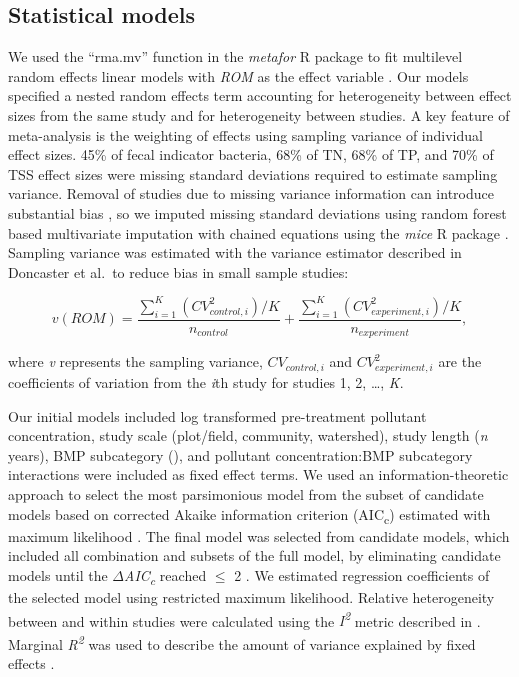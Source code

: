 \documentclass[utf8]{FrontiersinHarvard}
\begin{document}
\hypertarget{statistical-models}{%
\subsection{Statistical models}\label{statistical-models}}

We used the ``rma.mv'' function in the \emph{metafor} R package to fit
multilevel random effects linear models with \emph{ROM} as the effect
variable
\citep{viechtbauerConductingMetaanalysesMetafor2010, rcoreteamLanguageEnvironmentStatistical2023}.
Our models specified a nested random effects term accounting for
heterogeneity between effect sizes from the same study and for
heterogeneity between studies. A key feature of meta-analysis is the
weighting of effects using sampling variance of individual effect sizes.
45\% of fecal indicator bacteria, 68\% of TN, 68\% of TP, and 70\% of
TSS effect sizes were missing standard deviations required to estimate
sampling variance. Removal of studies due to missing variance
information can introduce substantial bias
\citep{kambachConsequencesMultipleImputation2020}, so we imputed missing
standard deviations using random forest based multivariate imputation
with chained equations using the \emph{mice} R package
\citep{buurenMiceMultivariateImputation2011}. Sampling variance was
estimated with the variance estimator described in Doncaster et al.~to
reduce bias in small sample studies:

\[
v(ROM) = \frac{\sum_{i=1}^{K}{(CV^2_{control,i})/K}}{n_{control}} + \frac{\sum_{i=1}^{K}{(CV^2_{experiment,i})/K}}{n_{experiment}},
\]

where \emph{v} represents the sampling variance, \(CV_{control,i}\) and
\(CV^2_{experiment,i}\) are the coefficients of variation from the
\emph{i}th study for studies 1, 2, \ldots, \emph{K}.

Our initial models included log transformed pre-treatment pollutant
concentration, study scale (plot/field, community, watershed), study
length (\emph{n} years), BMP subcategory (), and pollutant
concentration:BMP subcategory interactions were included as fixed effect
terms. We used an information-theoretic approach to select the most
parsimonious model from the subset of candidate models based on
corrected Akaike information criterion (AIC\textsubscript{c}) estimated
with maximum likelihood \citep{cinarUsingInformationTheoretic2021}. The
final model was selected from candidate models, which included all
combination and subsets of the full model, by eliminating candidate
models until the \(\Delta\)\emph{AIC\textsubscript{c}} reached \(\leq\)
2 \citep{burnhamAICModelSelection2011}. We estimated regression
coefficients of the selected model using restricted maximum likelihood.
Relative heterogeneity between and within studies were calculated using
the \emph{I\textsuperscript{2}} metric described in
\citet{nakagawaMethodologicalIssuesAdvances2012}. Marginal
\emph{R\textsuperscript{2}} was used to describe the amount of variance
explained by fixed effects \citep{nakagawaGeneralSimpleMethod2013}.
\end{document}
